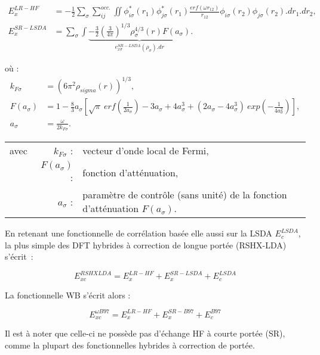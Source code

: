 {{\begin{align}
E_{x}^{LR-HF} &= -\frac{1}{2} \sum_{\sigma} \sum_{ij}^{occ.} \iint \phi_{i \sigma}^{*}(r_{1}) \phi_{j \sigma}^{*}(r_{1}) \frac{erf(\omega r_{12})}{r_{12}} \phi_{i \sigma}(r_{2}) \phi_{j \sigma}(r_{2}).dr_{1}.dr_{2}, \\
E_{x}^{SR-LSDA} &= \sum_{\sigma} \int \underbrace{-\frac{3}{2}\left(\frac{3}{4\pi}\right)^{1/3}\rho_{\sigma}^{4/3} (r) F(a_{\sigma})}_{e_{x \sigma}^{SR-LSDA} (\rho_{\sigma}) .dr}.
\end{align}

\noindent où :
\begin{align}
k_{F \sigma}&=(6\pi^{2}\rho_{sigma}(r))^{1/3},\nonumber\\
F(a_{\sigma})&=1-\frac{8}{3}a_{\sigma}\left[\sqrt{\pi}\: erf\left(\frac{1}{2a_{\sigma}}\right)-3a_{\sigma}+4a_{\sigma}^{3}+(2a_{\sigma}-4a_{\sigma}^{3}) \: exp\left(-\frac{1}{4a_{\sigma}^{2}}\right)\right],\nonumber\\
a_{\sigma}&=\frac{\omega}{2k_{F\sigma}}.\nonumber
\end{align}

\begin{flushleft}
\begin{tabular}{@{}lrp{10cm}}
avec & $k_{F\sigma}$ : & vecteur d'onde local de Fermi,\\
& $F(a_{\sigma})$ : & fonction d'atténuation,\\
& $a_{\sigma}$ : & paramètre de contrôle (sans unité) de la fonction d'atténuation $F(a_{\sigma})$.
\end{tabular}
\end{flushleft}

En retenant une fonctionnelle de corrélation basée elle aussi sur la LSDA $E_{c}^{LSDA}$, la plus simple des DFT hybrides à correction de longue portée (RSHX-LDA) s'écrit~:

\begin{equation}
E_{xc}^{RSHXLDA} = E_{x}^{LR-HF} + E_{x}^{SR-LSDA} + E_{c}^{LSDA}
\end{equation}

La fonctionnelle WB\cite{WB97X} s'écrit alors :

\begin{equation}
E_{xc}^{\omega B97} = E_{x}^{LR-HF} + E_{x}^{SR-B97} + E_{c}^{B97}
\end{equation}

Il est à noter que celle-ci ne possède pas d'échange HF à courte portée (SR), comme la plupart des fonctionnelles hybrides à correction de portée.

}}
